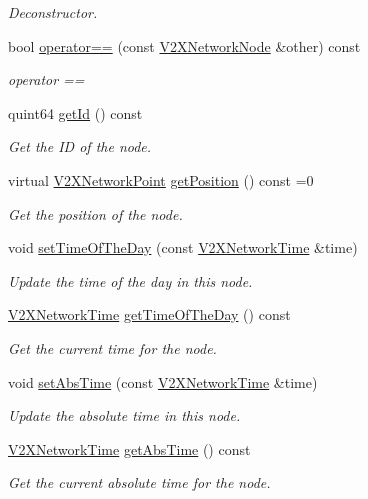\begin{DoxyCompactItemize}
\begin{DoxyCompactList}\small\item\em Deconstructor. \end{DoxyCompactList}\item 
bool \hyperlink{classV2XNetworkNode_ad1cbc1627c89e96af0ddb82a9e649665}{operator==} (const \hyperlink{classV2XNetworkNode}{V2\+X\+Network\+Node} \&other) const 
\begin{DoxyCompactList}\small\item\em operator == \end{DoxyCompactList}\item 
quint64 \hyperlink{classV2XNetworkNode_ab992d43cfb18c15932b649e8cde44682}{get\+Id} () const 
\begin{DoxyCompactList}\small\item\em Get the ID of the node. \end{DoxyCompactList}\item 
virtual \hyperlink{classV2XNetworkPoint}{V2\+X\+Network\+Point} \hyperlink{classV2XNetworkNode_aa214d725e50f8568f6b35acd949404d5}{get\+Position} () const =0
\begin{DoxyCompactList}\small\item\em Get the position of the node. \end{DoxyCompactList}\item 
void \hyperlink{classV2XNetworkNode_aa437171cebe336e110a0100647ca0dd5}{set\+Time\+Of\+The\+Day} (const \hyperlink{classV2XNetworkTime}{V2\+X\+Network\+Time} \&time)
\begin{DoxyCompactList}\small\item\em Update the time of the day in this node. \end{DoxyCompactList}\item 
\hyperlink{classV2XNetworkTime}{V2\+X\+Network\+Time} \hyperlink{classV2XNetworkNode_a6891c5e695b61431050b361bf0dcadaf}{get\+Time\+Of\+The\+Day} () const 
\begin{DoxyCompactList}\small\item\em Get the current time for the node. \end{DoxyCompactList}\item 
void \hyperlink{classV2XNetworkNode_a10426aaa56ca97cfefc331af3b4689ec}{set\+Abs\+Time} (const \hyperlink{classV2XNetworkTime}{V2\+X\+Network\+Time} \&time)
\begin{DoxyCompactList}\small\item\em Update the absolute time in this node. \end{DoxyCompactList}\item 
\hyperlink{classV2XNetworkTime}{V2\+X\+Network\+Time} \hyperlink{classV2XNetworkNode_a9b5a0a992279a423f171eb01e69213eb}{get\+Abs\+Time} () const 
\begin{DoxyCompactList}\small\item\em Get the current absolute time for the node. \end{DoxyCompactList}\end{DoxyCompactItemize}
